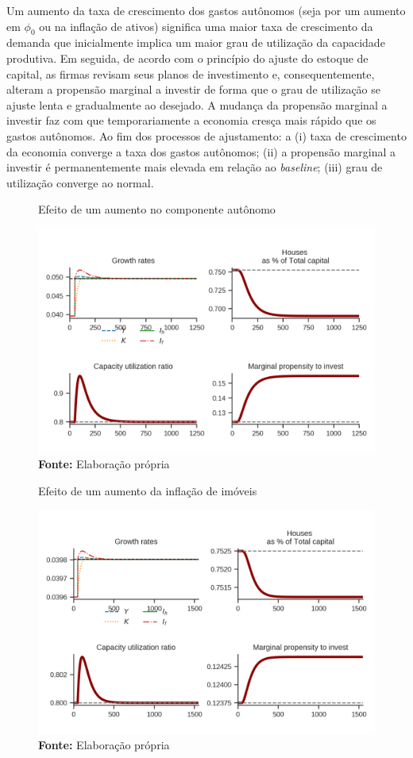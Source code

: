 Um aumento da taxa de crescimento dos gastos autônomos (seja por um aumento em $\phi_0$ ou na inflação de ativos) significa uma maior taxa de crescimento da demanda que inicialmente implica um maior grau de utilização da capacidade produtiva. Em seguida, de acordo com o princípio do ajuste do estoque de capital, as firmas revisam seus planos de investimento e, consequentemente, alteram a propensão marginal a investir de forma que o grau de utilização se ajuste lenta e gradualmente ao desejado. A mudança da propensão marginal a investir faz com que temporariamente a economia cresça mais rápido que os gastos autônomos. Ao fim dos processos de ajustamento: a (i) taxa de crescimento da economia converge a taxa dos gastos autônomos; (ii) a propensão marginal a investir é permanentemente mais elevada em relação ao \textit{baseline}; (iii) grau de utilização converge ao normal.



\begin{figure}[htb]
	\centering
	\caption{Efeito de um aumento no componente autônomo}
	\label{choque_1}
	\includegraphics{../../Modelo/Versoes/Shock_1.png}
	\caption*{\textbf{Fonte:} Elaboração própria}
\end{figure}


\begin{figure}[htb]
	\centering
	\caption{Efeito de um aumento da inflação de imóveis}
	\label{choque_4}
	\includegraphics{../../Modelo/Versoes/Shock_4.png}
	\caption*{\textbf{Fonte:} Elaboração própria}
\end{figure}

